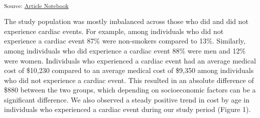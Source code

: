 \documentclass[
  letterpaper,
  DIV=11,
  numbers=noendperiod]{scrartcl}
\begin{document}
\begin{table}

\caption{\label{tbl-patients}Patient Characteristics}


\end{table}%

\textsubscript{Source:
\href{https://tracychid.github.io/EPI203_Assignment4/index.qmd.html}{Article
Notebook}}

The study population was mostly imbalanced across those who did and did
not experience cardiac events. For example, among individuals who did
not experience a cardiac event 87\% were non-smokers compared to 13\%.
Similarly, among individuals who did experience a cardiac event 88\%
were men and 12\% were women. Individuals who experienced a cardiac
event had an average medical cost of \$10,230 compared to an average
medical cost of \$9,350 among individuals who did not experience a
cardiac event. This resulted in an absolute difference of \$880 between
the two groups, which depending on socioeconomic factors can be a
significant difference. We also observed a steady positive trend in cost
by age in individuals who experienced a cardiac event during our study
period (Figure 1).
\end{document}
